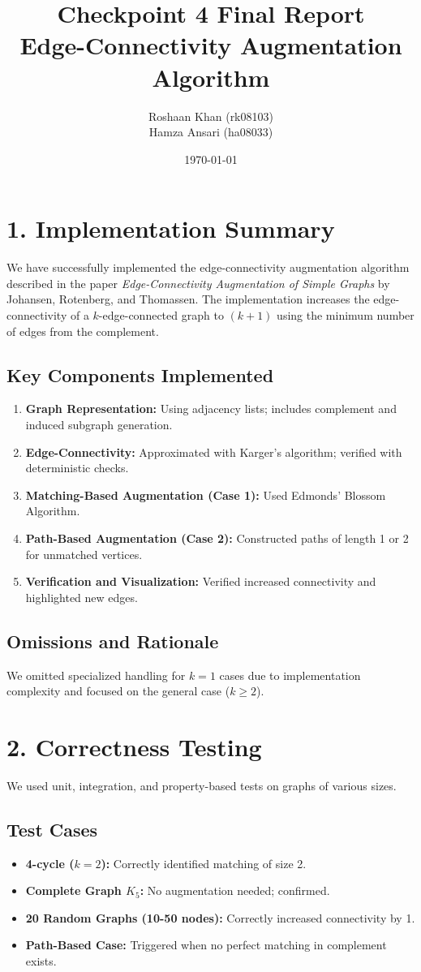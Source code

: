 \documentclass[11pt]{article}
\title{Checkpoint 4 Final Report \\ Edge-Connectivity Augmentation Algorithm}
\author{Roshaan Khan (rk08103) \\ Hamza Ansari (ha08033)}
\date{\today}
\begin{document}
\maketitle

\section*{1. Implementation Summary}
We have successfully implemented the edge-connectivity augmentation algorithm described in the paper \textit{Edge-Connectivity Augmentation of Simple Graphs} by Johansen, Rotenberg, and Thomassen. The implementation increases the edge-connectivity of a $k$-edge-connected graph to $(k+1)$ using the minimum number of edges from the complement.

\subsection*{Key Components Implemented}
\begin{enumerate}
  \item \textbf{Graph Representation:} Using adjacency lists; includes complement and induced subgraph generation.
  \item \textbf{Edge-Connectivity:} Approximated with Karger's algorithm; verified with deterministic checks.
  \item \textbf{Matching-Based Augmentation (Case 1):} Used Edmonds’ Blossom Algorithm.
  \item \textbf{Path-Based Augmentation (Case 2):} Constructed paths of length 1 or 2 for unmatched vertices.
  \item \textbf{Verification and Visualization:} Verified increased connectivity and highlighted new edges.
\end{enumerate}

\subsection*{Omissions and Rationale}
We omitted specialized handling for $k=1$ cases due to implementation complexity and focused on the general case ($k \geq 2$).

\section*{2. Correctness Testing}
We used unit, integration, and property-based tests on graphs of various sizes.

\subsection*{Test Cases}
\begin{itemize}
  \item \textbf{4-cycle ($k=2$):} Correctly identified matching of size 2.
  \item \textbf{Complete Graph $K_5$:} No augmentation needed; confirmed.
  \item \textbf{20 Random Graphs (10-50 nodes):} Correctly increased connectivity by 1.
  \item \textbf{Path-Based Case:} Triggered when no perfect matching in complement exists.
\end{itemize}
\end{document}
